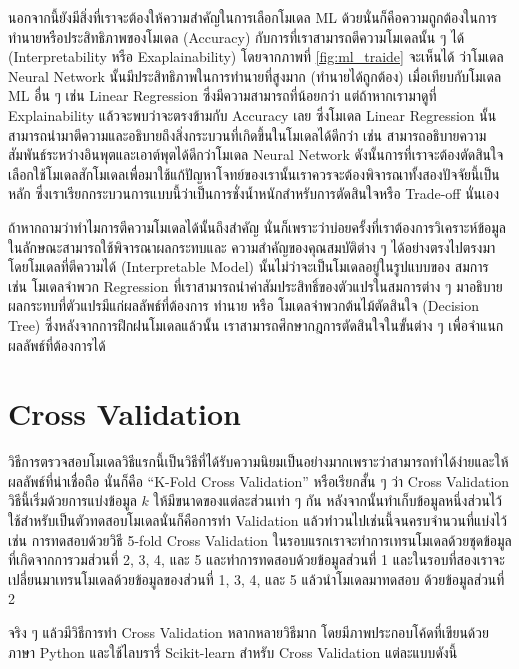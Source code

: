นอกจากนี้ยังมีสิ่งที่เราจะต้องให้ความสำคัญในการเลือกโมเดล ML ด้วยนั่นก็คือความถูกต้องในการทำนายหรือประสิทธิภาพของโมเดล (Accuracy) 
กับการที่เราสามารถตีความโมเดลนั้น ๆ ได้ (Interpretability หรือ Exaplainability) โดยจากภาพที่ \ref{fig:ml_traide} จะเห็นได้%
ว่าโมเดล Neural Network นั้นมีประสิทธิภาพในการทำนายที่สูงมาก (ทำนายได้ถูกต้อง) เมื่อเทียบกับโมเดล ML อื่น ๆ เช่น Linear Regression 
ซึ่งมีความสามารถที่น้อยกว่า แต่ถ้าหากเรามาดูที่ Explainability แล้วจะพบว่าจะตรงข้ามกับ Accuracy เลย ซึ่งโมเดล Linear Regression 
นั้นสามารถนำมาตีความและอธิบายถึงสิ่งกระบวนที่เกิดขึ้นในโมเดลได้ดีกว่า เช่น สามารถอธิบายความสัมพันธ์ระหว่างอินพุตและเอาต์พุตได้ดีกว่าโมเดล 
Neural Network ดังนั้นการที่เราจะต้องตัดสินใจเลือกใช้โมเดลสักโมเดลเพื่อมาใช้แก้ปัญหาโจทย์ของเรานั้นเราควรจะต้องพิจารณาทั้งสองปัจจัยนี้เป็นหลัก
ซึ่งเราเรียกกระบวนการแบบนี้ว่าเป็นการชั่งน้ำหนักสำหรับการตัดสินใจหรือ Trade-off นั่นเอง

ถ้าหากถามว่าทำไมการตีความโมเดลได้นั้นถึงสำคัญ นั่นก็เพราะว่าบ่อยครั้งที่เราต้องการวิเคราะห์ข้อมูลในลักษณะสามารถใช้พิจารณาผลกระทบและ%
ความสำคัญของคุณสมบัติต่าง ๆ ได้อย่างตรงไปตรงมา โดยโมเดลที่ตีความได้ (Interpretable Model) นั้นไม่ว่าจะเป็นโมเดลอยู่ในรูปแบบของ%
สมการ เช่น โมเดลจำพวก Regression ที่เราสามารถนำค่าสัมประสิทธิ์ของตัวแปรในสมการต่าง ๆ มาอธิบายผลกระทบที่ตัวแปรมีแก่ผลลัพธ์ที่ต้องการ%
ทำนาย หรือ โมเดลจำพวกต้นไม้ตัดสินใจ (Decision Tree) ซึ่งหลังจากการฝึกฝนโมเดลแล้วนั้น เราสามารถศึกษากฎการตัดสินใจในขั้นต่าง ๆ 
เพื่อจำแนกผลลัพธ์ที่ต้องการได้

\section{Cross Validation}
\label{sec:cross_val}

วิธีการตรวจสอบโมเดลวิธีแรกนี้เป็นวิธีที่ได้รับความนิยมเป็นอย่างมากเพราะว่าสามารถทำได้ง่ายและให้ผลลัพธ์ที่น่าเชื่อถือ นั่นก็คือ 
\enquote{K-Fold Cross Validation} หรือเรียกสั้น ๆ ว่า Cross Validation วิธีนี้เริ่มด้วยการแบ่งข้อมูล $k$ ให้มีขนาดของแต่ละส่วนเท่า ๆ กัน 
หลังจากนั้นทำเก็บข้อมูลหนึ่งส่วนไว้ใช้สำหรับเป็นตัวทดสอบโมเดลนั่นก็คือการทำ Validation แล้วทําวนไปเช่นนี้จนครบจํานวนที่แบ่งไว้ เช่น 
การทดสอบด้วยวิธี 5-fold Cross Validation ในรอบแรกเราจะทำการเทรนโมเดลด้วยชุดข้อมูลที่เกิดจากการวมส่วนที่ 2, 3, 4, และ 5 
และทำการทดสอบด้วยข้อมูลส่วนที่ 1 และในรอบที่สองเราจะเปลี่ยนมาเทรนโมเดลด้วยข้อมูลของส่วนที่ 1, 3, 4, และ 5 แล้วนำโมเดลมาทดสอบ%
ด้วยข้อมูลส่วนที่ 2

จริง ๆ แล้วมีวิธีการทำ Cross Validation หลากหลายวิธีมาก โดยมีภาพประกอบโค้ดที่เขียนด้วยภาษา Python และใช้ไลบรารี่ Scikit-learn 
สำหรับ Cross Validation แต่ละแบบดังนี้

